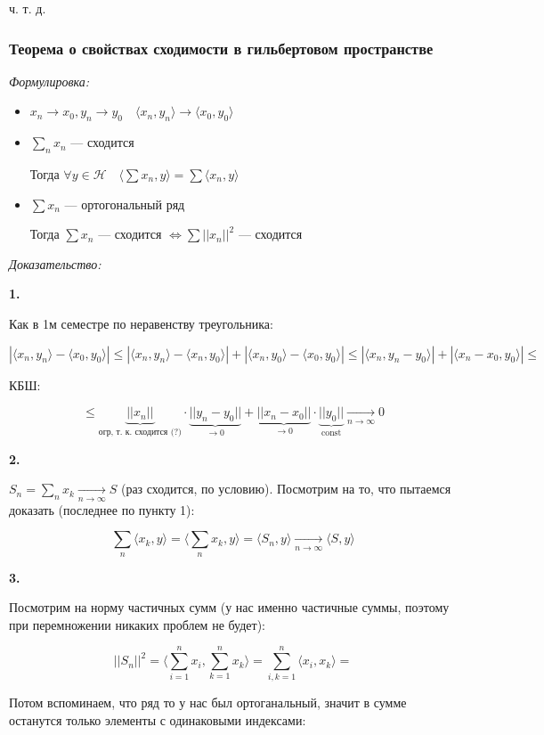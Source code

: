 \documentclass{article}
\def\goesto#1{\underset{#1}{\longrightarrow}}
\def\toinf#1{\goesto{#1 \rightarrow \infty}}
\def\ntoinf{\toinf{n}}
\def\sk#1#2{\langle #1, #2 \rangle}
\DeclareMathOperator{\const}{const}
\begin{document}
ч. т. д. 

\newpage


\subsubsection{Теорема о свойствах сходимости в гильбертовом пространстве}
\textit{Формулировка:}

\begin{itemize}
    \item $x_n \rightarrow x_0, y_n \rightarrow y_0 \quad \langle x_n, y_n \rangle \rightarrow \langle x_0, y_0 \rangle$
    \item $\sum_n x_n$ --- сходится
    
    Тогда $\forall y \in \mathcal{H} \quad \langle \sum x_n , y\rangle = \sum \langle x_n, y \rangle$

    \item $\sum x_n$ --- ортогональный ряд
    
    Тогда $\sum x_n$ --- сходится $\Leftrightarrow \sum ||x_n||^2$ --- сходится
\end{itemize}

\textit{Доказательство:}

\textbf{1.}

Как в 1м семестре по неравенству треугольника:

\[|\sk{x_n}{y_n} -\sk{x_0}{y_0}| \le |\sk{x_n}{y_n} - \sk{x_n}{y_0}| + |\sk{x_n}{y_0} - \sk{x_0}{y_0}| \le |\sk{x_n}{y_n - y_0}| + |\sk{x_n - x_0}{y_0}| \le \]

КБШ:

\[ \le \underbrace{||x_n||}_{\text{огр, т. к. сходится (?)}} \cdot \underbrace{||y_n - y_0||}_{\rightarrow 0} + \underbrace{||x_n - x_0||}_{\rightarrow 0} \cdot \underbrace{||y_0||}_{\const} \ntoinf 0\]

\textbf{2.}

$S_n = \sum_n x_k \ntoinf S$ (раз сходится, по условию). Посмотрим на то, что пытаемся доказать (последнее по пункту 1):

\[\sum_n \sk{x_k}{y} = \sk{\sum_n x_k}{y} = \sk{S_n}{y} \ntoinf \sk{S}{y}\]

\textbf{3.}

Посмотрим на норму частичных сумм (у нас именно частичные суммы, поэтому при перемножении никаких проблем не будет):

\[||S_n||^2 = \sk{\sum_{i = 1}^n x_i}{\sum_{k = 1}^n x_k} = \sum_{i, k = 1}^n \sk{x_i}{x_k} =\]

Потом вспоминаем, что ряд то у нас был ортоганальный, значит в сумме останутся только элементы с одинаковыми индексами:
\end{document}

